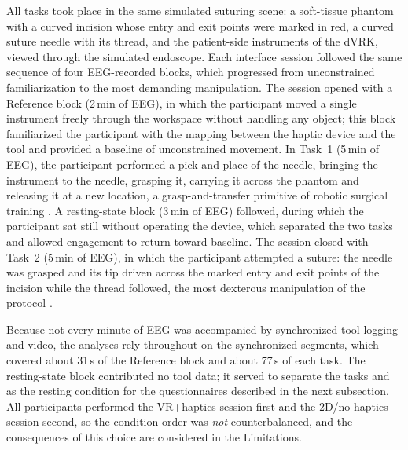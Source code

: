 \documentclass[utf8]{frontiers_suppmat}
\begin{document}
All tasks took place in the same simulated suturing scene: a soft-tissue phantom with a curved incision whose entry and exit points were marked in red, a curved suture needle with its thread, and the patient-side instruments of the dVRK, viewed through the simulated endoscope. Each interface session followed the same sequence of four EEG-recorded blocks, which progressed from unconstrained familiarization to the most demanding manipulation. The session opened with a Reference block (2\,min of EEG), in which the participant moved a single instrument freely through the workspace without handling any object; this block familiarized the participant with the mapping between the haptic device and the tool and provided a baseline of unconstrained movement. In Task~1 (5\,min of EEG), the participant performed a pick-and-place of the needle, bringing the instrument to the needle, grasping it, carrying it across the phantom and releasing it at a new location, a grasp-and-transfer primitive of robotic surgical training \cite{Jackson2013,ManojVarier2020}. A resting-state block (3\,min of EEG) followed, during which the participant sat still without operating the device, which separated the two tasks and allowed engagement to return toward baseline. The session closed with Task~2 (5\,min of EEG), in which the participant attempted a suture: the needle was grasped and its tip driven across the marked entry and exit points of the incision while the thread followed, the most dexterous manipulation of the protocol \cite{Lobbezoo2021,Chiu2020}.

Because not every minute of EEG was accompanied by synchronized tool logging and video, the analyses rely throughout on the synchronized segments, which covered about 31\,s of the Reference block and about 77\,s of each task. The resting-state block contributed no tool data; it served to separate the tasks and as the resting condition for the questionnaires described in the next subsection. All participants performed the VR+haptics session first and the 2D/no-haptics session second, so the condition order was \emph{not} counterbalanced, and the consequences of this choice are considered in the Limitations.
\end{document}
